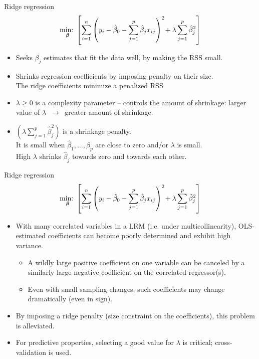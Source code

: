 \documentclass{beamer}
\begin{document}
\begin{frame}{Ridge regression}
$$\underset{\bm{\beta}}{\textnormal{min:~}}
\left[ \sum_{i=1}^n \left(y_i - \hat{\beta}_0 
- \sum_{j=1}^p  \hat{\beta}_j x_{ij} \right)^2 
\! + \lambda \sum_{j=1}^p  \hat{\beta}_j^2 \right]
$$
\begin{itemize}
\item Seeks $\beta_j$ estimates that fit the data well, by making the RSS small.
\smallskip
\item Shrinks regression coefficients by imposing penalty on their size. \\The ridge coefficients minimize a penalized RSS
\smallskip
\item $\lambda \geq 0$ is a complexity parameter -- controls the amount of shrinkage:
larger value of $\lambda$ $~\rightarrow~$ greater amount of shrinkage.
\smallskip
\item $(\lambda \sum_{j=1}^p  \hat{\beta}_j^2)$ is a shrinkage penalty.\\It is small when $\hat{\beta}_1, \dots, \hat{\beta}_p$ are close to zero and/or $\lambda$ is small. \\High $\lambda$ shrinks $\hat{\beta}_j$ towards zero and towards each other.
\end{itemize}
\end{frame}
\begin{frame}{Ridge regression}
$$\underset{\bm{\beta}}{\textnormal{min:~}} 
\left[ \sum_{i=1}^n \left(y_i - \hat{\beta}_0 
- \sum_{j=1}^p  \hat{\beta}_j x_{ij} \right)^2 
\! + \lambda \sum_{j=1}^p  \hat{\beta}_j^2 \right]
$$
\begin{itemize}
\item With many correlated variables in a LRM (i.e. under multicollinearity),
OLS-estimated coefficients can become poorly determined and exhibit high variance.
\begin{itemize}
    \item A wildly large positive coefficient on one variable can be canceled by a
similarly large negative coefficient on the correlated regressor(s).
    \item Even with small sampling changes, such coefficients may change dramatically (even in sign).
\end{itemize}
\item By imposing a ridge penalty (size constraint on the coefficients), this problem is alleviated.
\smallskip
\item For predictive properties, selecting a good value for $\lambda$ is critical; cross-validation is used.
\end{itemize}
\end{frame}
\end{document}
